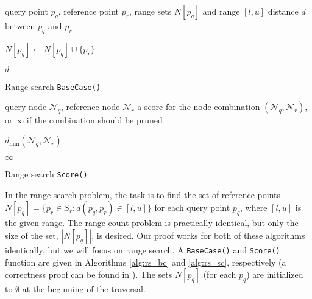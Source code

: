 \begin{algorithm}[tb]
\begin{algorithmic}[1]
     query point $p_q$, reference point $p_r$, range
sets $N[p_q]$ and range $[l, u]$
     distance $d$ between $p_q$ and $p_r$


    \STATE  $N[p_q] \gets N[p_q] \cup \{ p_r \}$
    \ENDIF

    \RETURN $d$
  \end{algorithmic}
  \caption{Range search \texttt{BaseCase()}}
  \label{alg:rs_bc}
\end{algorithm}

\begin{algorithm}[tb]
  \begin{algorithmic}[1]
     query node $\mathscr{N}_q$, reference node
$\mathscr{N}_r$
     a score for the node combination $(\mathscr{N}_q,
\mathscr{N}_r)$, or $\infty$ if the combination should be pruned

    \medskip

      \RETURN $d_{\min}(\mathscr{N}_q, \mathscr{N}_r)$
    \ENDIF

    \RETURN $\infty$
  \end{algorithmic}
  \caption{Range search \texttt{Score()}}
  \label{alg:rs_sc}
\end{algorithm}

In the range search problem, the task is to find the set of reference points
$N[p_q] = \{ p_r \in S_r : d(p_q, p_r) \in [l, u] \}$
for each query point $p_q$, where $[l, u]$ is the given
range.  The range count problem is practically identical, but only the size of
the set, $|N[p_q]|$, is desired.
Our proof works for both of these algorithms
identically, but we will focus on range search.  A \texttt{BaseCase()} and
\texttt{Score()} function are given in Algorithms \ref{alg:rs_bc} and
\ref{alg:rs_sc}, respectively (a correctness proof can be found in
\cite{curtin2013tree}).  The sets $N[p_q]$ (for each $p_q$) are
initialized to $\emptyset$ at the beginning of the traversal.

